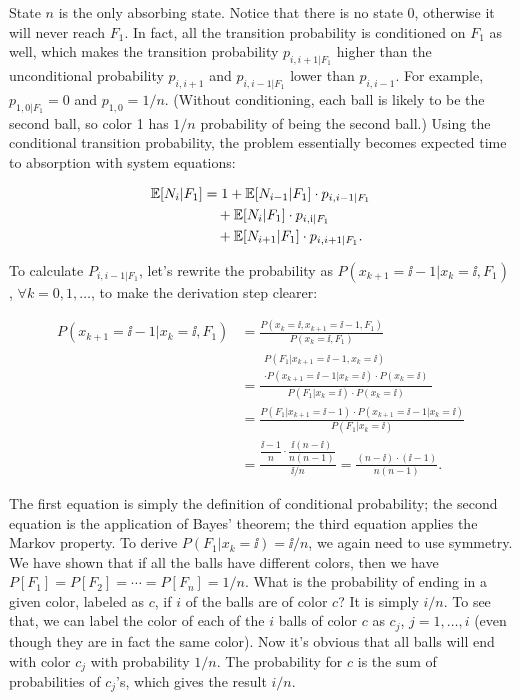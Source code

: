 \begin{solution}
State $n$ is the only absorbing state. Notice that there is no state 0, otherwise it will never reach
$F_1$. In fact, all the transition probability is conditioned on $F_1$ as well, which makes the
transition probability $p_{i,i+1\vert F_1}$ higher than the unconditional probability $p_{i,i+1}$ and
$p_{i,i-1\vert F_1}$ lower than $p_{i,i-1}$. For example, $p_{1,0\vert F_1}=0$ and $p_{1,0}=1/n$.
(Without conditioning, each ball is likely to be the second ball, so color 1 has $1/n$ probability of
being the second ball.) Using the conditional transition probability, the problem essentially becomes
expected time to absorption with system equations:

\[
\begin{aligned}
\mathbb{E}[N_i\vert F_1]
&=1+\mathbb{E}[N_{i-1}\vert F_1]\cdot p_{i,i-1\vert F_1}\\
&\quad+\mathbb{E}[N_i\vert F_1]\cdot p_{i,\mathrm{i}\vert F_1}\\
&\quad+\mathbb{E}[N_{i+1}\vert F_1]\cdot p_{i,i+1\vert F_1}.
\end{aligned}
\]


To calculate $P_{i,i-1\vert F_1}$, let's rewrite the probability as
$P(x_{k+1}=\ii-1\vert x_k=\ii,F_1)$, $\forall k=0,1,\ldots$, to make the derivation step clearer:

\[
\begin{aligned}
P(x_{k+1}=\ii-1\vert x_k=\ii,F_1)
&=\frac{P(x_k=\ii,x_{k+1}=\ii-1,F_1)}{P(x_k=\ii,F_1)}\\
&=\frac{\begin{gathered}
P(F_1\vert x_{k+1}=\ii-1,x_k=\ii)\\
\cdot P(x_{k+1}=\ii-1\vert x_k=\ii)\cdot P(x_k=\ii)
\end{gathered}}{P(F_1\vert x_k=\ii)\cdot P(x_k=\ii)}\\
&=\frac{P(F_1\vert x_{k+1}=\ii-1)\cdot P(x_{k+1}=\ii-1\vert x_k=\ii)}{P(F_1\vert x_k=\ii)}\\
&=\frac{\dfrac{\ii-1}{n}\cdot\dfrac{\ii(n-\ii)}{n(n-1)}}{\ii/n}
 =\frac{(n-\ii)\cdot(\ii-1)}{n(n-1)}.
\end{aligned}
\]

The first equation is simply the definition of conditional probability; the second equation is the
application of Bayes' theorem; the third equation applies the Markov property. To derive
$P(F_1\vert x_k=\ii)=\ii/n$, we again need to use symmetry. We have shown that if all the balls have
different colors, then we have $P[F_1]=P[F_2]=\cdots=P[F_n]=1/n$. What is the probability of ending
in a given color, labeled as $c$, if $i$ of the balls are of color $c$? It is simply $i/n$. To see
that, we can label the color of each of the $i$ balls of color $c$ as $c_j$, $j=1,\ldots,i$ (even
though they are in fact the same color). Now it's obvious that all balls will end with color $c_j$ with
probability $1/n$. The probability for $c$ is the sum of probabilities of $c_j$'s, which gives the
result $i/n$.


\end{solution}
